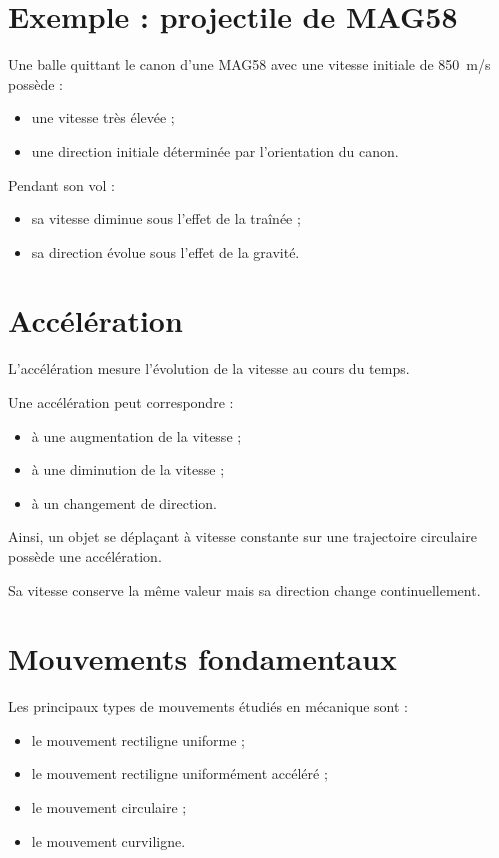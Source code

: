 \section{Exemple : projectile de MAG58}

Une balle quittant le canon d'une MAG58 avec une vitesse initiale de
850~m/s possède :

\begin{itemize}
    \item une vitesse très élevée ;
    \item une direction initiale déterminée par l'orientation du canon.
\end{itemize}

Pendant son vol :

\begin{itemize}
    \item sa vitesse diminue sous l'effet de la traînée ;
    \item sa direction évolue sous l'effet de la gravité.
\end{itemize}

\section{Accélération}

L'accélération mesure l'évolution de la vitesse au cours du temps.

Une accélération peut correspondre :

\begin{itemize}
    \item à une augmentation de la vitesse ;
    \item à une diminution de la vitesse ;
    \item à un changement de direction.
\end{itemize}

Ainsi, un objet se déplaçant à vitesse constante sur une trajectoire
circulaire possède une accélération.

Sa vitesse conserve la même valeur mais sa direction change continuellement.

\section{Mouvements fondamentaux}

Les principaux types de mouvements étudiés en mécanique sont :

\begin{itemize}
    \item le mouvement rectiligne uniforme ;
    \item le mouvement rectiligne uniformément accéléré ;
    \item le mouvement circulaire ;
    \item le mouvement curviligne.
\end{itemize}

